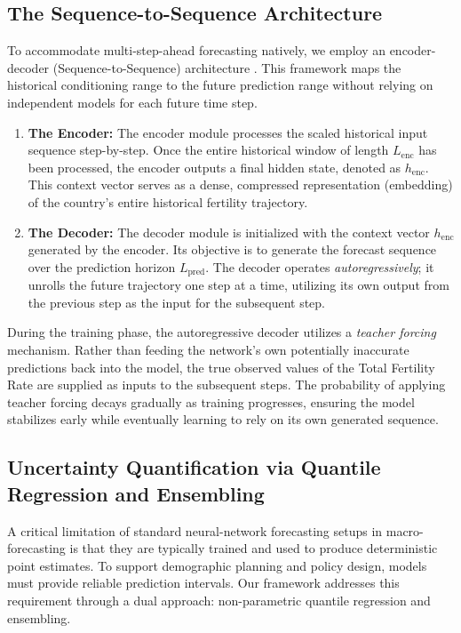 \documentclass[12pt]{article}
\begin{document}
\subsection{The Sequence-to-Sequence Architecture}

To accommodate multi-step-ahead forecasting natively, we employ an encoder-decoder (Sequence-to-Sequence) architecture \citep{sutskever2014sequence}. This framework maps the historical conditioning range to the future prediction range without relying on independent models for each future time step.

\begin{enumerate}
    \item \textbf{The Encoder:} The encoder module processes the scaled historical input sequence step-by-step. Once the entire historical window of length $L_{\text{enc}}$ has been processed, the encoder outputs a final hidden state, denoted as $h_{\text{enc}}$. This context vector serves as a dense, compressed representation (embedding) of the country's entire historical fertility trajectory.
    \item \textbf{The Decoder:} The decoder module is initialized with the context vector $h_{\text{enc}}$ generated by the encoder. Its objective is to generate the forecast sequence over the prediction horizon $L_{\text{pred}}$. The decoder operates \textit{autoregressively}; it unrolls the future trajectory one step at a time, utilizing its own output from the previous step as the input for the subsequent step. 
\end{enumerate}

During the training phase, the autoregressive decoder utilizes a \textit{teacher forcing} mechanism. Rather than feeding the network's own potentially inaccurate predictions back into the model, the true observed values of the Total Fertility Rate are supplied as inputs to the subsequent steps. The probability of applying teacher forcing decays gradually as training progresses, ensuring the model stabilizes early while eventually learning to rely on its own generated sequence.


\subsection{Uncertainty Quantification via Quantile Regression and Ensembling}

A critical limitation of standard neural-network forecasting setups in macro-forecasting is that they are typically trained and used to produce deterministic point estimates. To support demographic planning and policy design, models must provide reliable prediction intervals. Our framework addresses this requirement through a dual approach: non-parametric quantile regression and ensembling.
\end{document}

